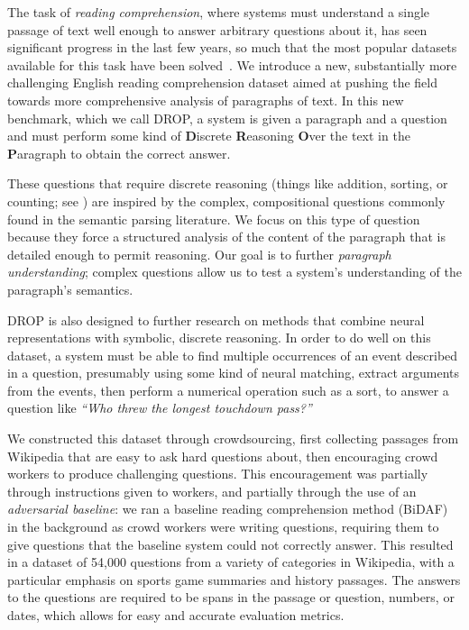 The task of \emph{reading comprehension}, where systems must understand a single passage of text well enough to answer arbitrary questions about it, has seen significant progress in the last few years, so much that the most popular datasets available for this task have been solved~\citep{Chen2016ATE,Devlin2018BERTPO}.  We introduce a new, substantially more challenging English reading comprehension dataset aimed at pushing the field towards more comprehensive analysis of paragraphs of text.  In this new benchmark, which we call DROP, a system is given a paragraph and a question and must perform some kind of {\bf D}iscrete {\bf R}easoning {\bf O}ver the text in the {\bf P}aragraph to obtain the correct answer.

These questions that require discrete reasoning (things like addition, sorting, or counting; see ) are inspired by the complex, compositional questions commonly found in the semantic parsing literature.  We focus on this type of question because they force a structured analysis of the content of the paragraph that is detailed enough to permit reasoning.  Our goal is to further \emph{paragraph understanding}; complex questions allow us to test a system's understanding of the paragraph's semantics.

DROP is also designed to further research on methods that combine neural  representations with symbolic, discrete reasoning.  In order to do well on this dataset, a system must be able to find multiple occurrences of an event described in a question, presumably using some kind of neural  matching, extract arguments from the events, then perform a numerical operation such as a sort, to answer a question like \textit{``Who threw the longest touchdown pass?''}

We constructed this dataset through crowdsourcing, first collecting passages from Wikipedia that are easy to ask hard questions about, then encouraging crowd workers to produce challenging questions.  This encouragement was partially through instructions given to workers, and partially through the use of an \emph{adversarial baseline}: we ran a baseline reading comprehension method (BiDAF)~\citep{Seo2016BidirectionalAF} in the background as crowd workers were writing questions, requiring them to give questions that the baseline system could not correctly answer.  This resulted in a dataset of 54,000 questions from a variety of categories in Wikipedia, with a particular emphasis on sports game summaries and history passages.  The answers to the questions are required to be spans in the passage or question, numbers, or dates, which allows for easy and accurate evaluation metrics.

